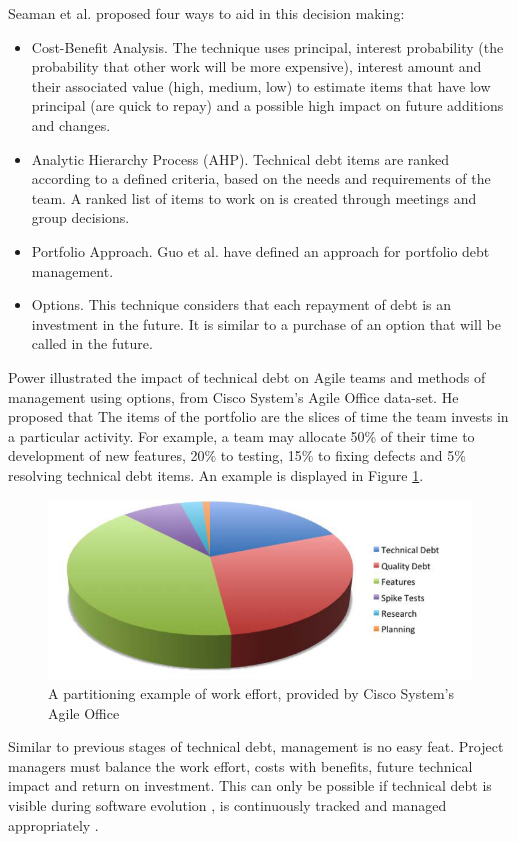 \documentclass{mprop}
\begin{document}
Seaman et al. \cite{Seaman2012} proposed four ways to aid in this decision
making:
\begin{itemize}
	\item Cost-Benefit Analysis. The technique uses principal, interest
	      probability (the probability that other work will be more expensive),
	      interest amount and their associated value (high, medium, low) to
	      estimate items that have low principal (are quick to repay) and a
	      possible high impact on future additions and changes.
	\item Analytic Hierarchy Process (AHP). Technical debt items are ranked
	      according to a defined criteria, based on the needs and requirements of the
	      team. A ranked list of items to work on is created through meetings and
	      group decisions.
	\item Portfolio Approach. Guo et al. \cite{Guo2011} have defined an approach
	      for portfolio debt management.
	\item Options. This technique considers that each repayment of debt is an
	      investment in the future. It is similar to a purchase of an option
	      \cite{option-investopedia} that will be called in the future.
\end{itemize}

Power \cite{Power2013} illustrated the impact of technical debt on Agile teams
and methods of management using options, from Cisco System's Agile Office
data-set. He proposed that The items of the portfolio are the slices of time the
team invests in a particular activity. For example, a team may allocate 50\% of
their time to development of new features, 20\% to testing, 15\% to fixing
defects and 5\% resolving technical debt items. An example is displayed in
Figure \ref{fig:td-options}.

\begin{figure}
	\centering
	\includegraphics[width=0.5\linewidth]{visualisations/td-options.png}
	\caption{A partitioning example of work effort, provided by Cisco System's Agile Office}
	\label{fig:td-options}
\end{figure}

Similar to previous stages of technical debt, management is no easy feat.
Project managers must balance the work effort, costs with benefits, future
technical impact and return on investment. This can only be possible if
technical debt is visible during software evolution \cite{Lim2012}
\cite{Morgenthaler2012} \cite{Codabux2013}, is continuously tracked and managed
appropriately \cite{Cunningham1993}.
\end{document}
